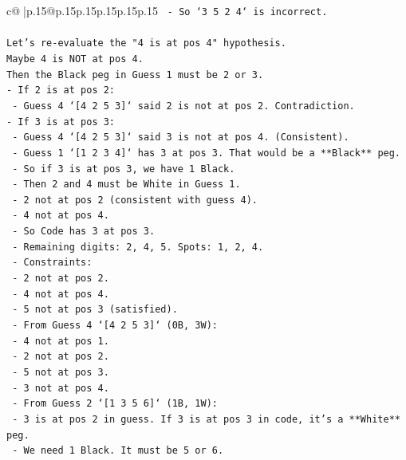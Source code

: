 \documentclass{article}
\begin{document}
{\begin{supertabular}{c@{$\;$}|p{.15\linewidth}@{}p{.15\linewidth}p{.15\linewidth}p{.15\linewidth}p{.15\linewidth}p{.15\linewidth}}
{{{\texttt{            {-}   So `3 5 2 4` is incorrect.} \\
\\ 
\texttt{Let's re{-}evaluate the "4 is at pos 4" hypothesis.} \\
\texttt{Maybe 4 is NOT at pos 4.} \\
\texttt{Then the Black peg in Guess 1 must be 2 or 3.} \\
\texttt{{-}   If 2 is at pos 2:} \\
\texttt{    {-}   Guess 4 `{[}4 2 5 3{]}` said 2 is not at pos 2. Contradiction.} \\
\texttt{{-}   If 3 is at pos 3:} \\
\texttt{    {-}   Guess 4 `{[}4 2 5 3{]}` said 3 is not at pos 4. (Consistent).} \\
\texttt{    {-}   Guess 1 `{[}1 2 3 4{]}` has 3 at pos 3. That would be a **Black** peg.} \\
\texttt{    {-}   So if 3 is at pos 3, we have 1 Black.} \\
\texttt{    {-}   Then 2 and 4 must be White in Guess 1.} \\
\texttt{        {-}   2 not at pos 2 (consistent with guess 4).} \\
\texttt{        {-}   4 not at pos 4.} \\
\texttt{    {-}   So Code has 3 at pos 3.} \\
\texttt{    {-}   Remaining digits: 2, 4, 5. Spots: 1, 2, 4.} \\
\texttt{    {-}   Constraints:} \\
\texttt{        {-}   2 not at pos 2.} \\
\texttt{        {-}   4 not at pos 4.} \\
\texttt{        {-}   5 not at pos 3 (satisfied).} \\
\texttt{    {-}   From Guess 4 `{[}4 2 5 3{]}` (0B, 3W):} \\
\texttt{        {-}   4 not at pos 1.} \\
\texttt{        {-}   2 not at pos 2.} \\
\texttt{        {-}   5 not at pos 3.} \\
\texttt{        {-}   3 not at pos 4.} \\
\texttt{    {-}   From Guess 2 `{[}1 3 5 6{]}` (1B, 1W):} \\
\texttt{        {-}   3 is at pos 2 in guess. If 3 is at pos 3 in code, it's a **White** peg.} \\
\texttt{        {-}   We need 1 Black. It must be 5 or 6.} \\
}}}
\end{supertabular}}
\end{document}
